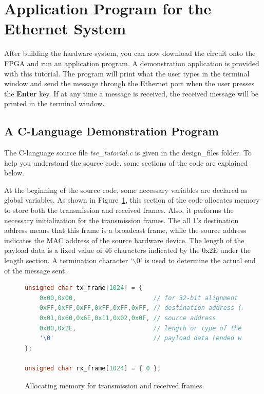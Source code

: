 \documentclass[11pt, twoside, pdftex]{article}
\begin{document}
\section{Application Program for the Ethernet System}
After building the hardware system, you can now download the circuit onto the FPGA and run an application program. A demonstration application is provided with this tutorial. The program will print what the user types in the terminal window and send the message through the Ethernet port when the user presses the {\bf Enter} key. If at any time a message is received, the received message will be printed in the terminal window. 

\subsection{A C-Language Demonstration Program}
The C-language source file {\it tse\_tutorial.c} is given in the design\_files folder. To help you understand the source code, some sections of the code are explained below.

At the beginning of the source code, some necessary variables are declared as global variables. As shown in Figure~\ref{fig:allocate_packets}, this section of the code allocates memory to store both the transmission and received frames. Also, it performs the necessary initialization for the transmission frames. The all 1's destination address means that this frame is a broadcast frame, while the source address indicates the MAC address of the source hardware device. The length of the payload data is a fixed value of 46 characters indicated by the 0x2E under the length section. A termination character `$\backslash$0' is used to determine the actual end of the message sent. 

\begin{figure}[H]
	\begin{lstlisting}[language=C]
unsigned char tx_frame[1024] = {
    0x00,0x00,                     // for 32-bit alignment
    0xFF,0xFF,0xFF,0xFF,0xFF,0xFF, // destination address (broadcast)
    0x01,0x60,0x6E,0x11,0x02,0x0F, // source address
    0x00,0x2E,                     // length or type of the payload data
    '\0'                           // payload data (ended with termination char)
};

unsigned char rx_frame[1024] = { 0 };
	\end{lstlisting}
	\caption{Allocating memory for transmission and received frames.}
	\label{fig:allocate_packets}
\end{figure}
\end{document}
